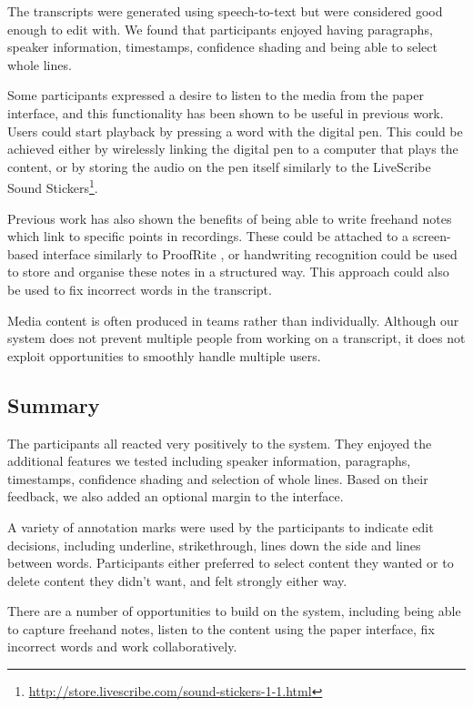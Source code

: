 
The transcripts were generated using speech-to-text but were considered good enough to edit with. We found that
participants enjoyed having paragraphs, speaker information, timestamps, confidence shading and being able to select
whole lines.

Some participants expressed a desire to listen to the media from the paper interface, and this functionality has been
shown to be useful in previous work. %
Users could start playback by pressing a word with the digital pen. This could be
achieved either by wirelessly linking the digital pen to a computer that plays the content, or by storing the audio on
the pen itself similarly to the LiveScribe Sound
Stickers\footnote{\url{http://store.livescribe.com/sound-stickers-1-1.html}}.

Previous work has also shown the benefits of being able to write freehand notes which link to specific points in
recordings. These could be attached to a screen-based interface similarly to ProofRite \citep{Conroy2004}, or
handwriting recognition could be used to store and organise these notes in a structured way. This approach could also
be used to fix incorrect words in the transcript.

Media content is often produced in teams rather than individually.  Although our system does not prevent multiple
people from working on a transcript, it does not exploit opportunities to smoothly handle multiple users.

\subsection{Summary}
The participants all reacted very positively to the system. They enjoyed the additional features we tested including
speaker information, paragraphs, timestamps, confidence shading and selection of whole lines. Based on their feedback,
we also added an optional margin to the interface.

A variety of annotation marks were used by the participants to indicate edit decisions, including underline,
strikethrough, lines down the side and lines between words.  Participants either preferred to select content they
wanted or to delete content they didn't want, and felt strongly either way.

There are a number of opportunities to build on the system, including being able to capture freehand notes, listen to
the content using the paper interface, fix incorrect words and work collaboratively.

